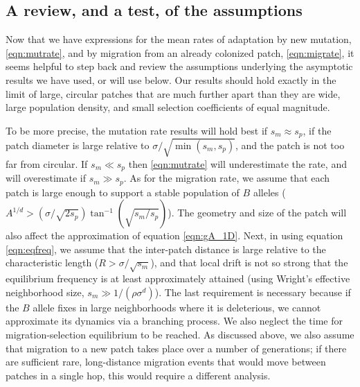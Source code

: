 \documentclass{article}
\begin{document}
\subsection{A review, and a test, of the assumptions}
\label{ss:assumptions}

Now that we have expressions for the mean rates of adaptation by new mutation, \eqref{eqn:mutrate},
and by migration from an already colonized patch, \eqref{eqn:migrate},
it seems helpful to step back and review the assumptions 
underlying the asymptotic results we have used, or will use below.
Our results should hold exactly in the limit of 
large, circular patches that are much further apart than they are wide,
large population density,
and small selection coefficients of equal magnitude.

To be more precise, the mutation rate results will hold best if $s_m \approx s_p$,
if the patch diameter is large relative to $\sigma/\sqrt{\min(s_m,s_p)}$,
and the patch is not too far from circular.
If $s_m \ll s_p$ then \eqref{eqn:mutrate} will underestimate the rate,
and will overestimate if $s_m \gg s_p$.
As for the migration rate,
we assume that 
each patch is large enough to support a stable population of $B$ alleles
($A^{1/d} > (\sigma/\sqrt{2s_p}) \tan^{-1}(\sqrt{s_m/s_p})$).
The geometry and size of the patch will also affect the approximation of equation \eqref{eqn:gA_1D}.
Next, in using equation \eqref{eqn:eqfreq}, we assume that 
the inter-patch distance is large relative to the characteristic length
($R > \sigma/\sqrt{s_m}$),
and that
local drift is not so strong that the equilibrium frequency is at least approximately attained
(using Wright's effective neighborhood size, $s_m \gg 1/(\rho \sigma^d)$).
The last requirement is necessary because if the $B$ allele fixes in large neighborhoods where it is deleterious,
we cannot approximate its dynamics via a branching process.
We also neglect the time for migration-selection equilibrium to be reached.
As discussed above, we also assume that migration to a new patch takes place over a number of generations;
if there are sufficient rare, long-distance migration events
that would move between patches in a single hop,
this would require a different analysis.
\end{document}
